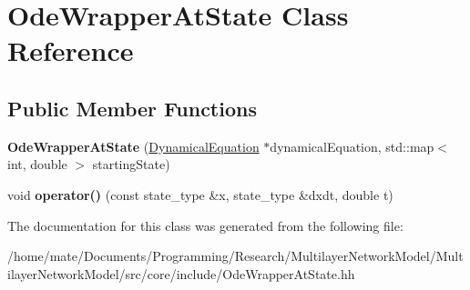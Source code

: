 \hypertarget{classOdeWrapperAtState}{}\section{Ode\+Wrapper\+At\+State Class Reference}
\label{classOdeWrapperAtState}
\subsection*{Public Member Functions}
\begin{DoxyCompactItemize}
\item 
{\bfseries Ode\+Wrapper\+At\+State} (\hyperlink{classDynamicalEquation}{Dynamical\+Equation} $\ast$dynamical\+Equation, std\+::map$<$ int, double $>$ starting\+State)\hypertarget{classOdeWrapperAtState_a85955ed459f5e5a374aac006ce555f41}{}\label{classOdeWrapperAtState_a85955ed459f5e5a374aac006ce555f41}

\item 
void {\bfseries operator()} (const state\+\_\+type \&x, state\+\_\+type \&dxdt, double t)\hypertarget{classOdeWrapperAtState_accd0221f4e8c7f809ef83693d6e7db05}{}\label{classOdeWrapperAtState_accd0221f4e8c7f809ef83693d6e7db05}

\end{DoxyCompactItemize}


The documentation for this class was generated from the following file\+:\begin{DoxyCompactItemize}
\item 
/home/mate/\+Documents/\+Programming/\+Research/\+Multilayer\+Network\+Model/\+Multilayer\+Network\+Model/src/core/include/Ode\+Wrapper\+At\+State.\+hh\end{DoxyCompactItemize}
